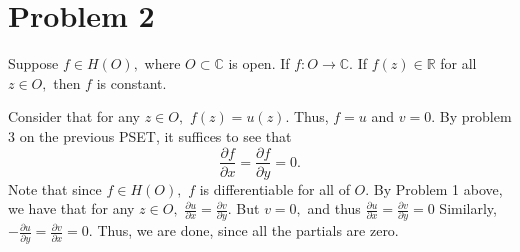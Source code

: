 \documentclass[11pt]{article}
\newcommand{\bbC}{\mathbb{C}}
\newcommand{\bbR}{\mathbb{R}}
\begin{document}
\newpage
\section*{Problem 2}
\begin{problem}
    Suppose $f \in H(O),$ where $O\subset \bbC$ is open. If $f: O \to \bbC.$ If $f(z) \in \bbR$ for all $z\in O,$ then $f$ is constant.
\end{problem}
\begin{solution}
Consider that for any $z\in O,$ $f(z) = u(z).$ Thus, $f = u$ and $v = 0.$
 By problem 3 on the previous PSET, it suffices to see that 
    \[\frac{\partial f}{\partial x} = \frac{\partial f}{\partial y} = 0.\] Note that since $f\in H(O),$ $f$ is differentiable for all of $O.$ By Problem 1 above, we have that for any $z\in O,$ 
    $\frac{\partial u}{\partial x} = \frac{\partial v}{\partial y}.$ But $v = 0,$ and thus $\frac{\partial u}{\partial x} = \frac{\partial v}{\partial y} = 0$ Similarly, $-\frac{\partial u}{\partial y} = \frac{\partial v}{\partial x} = 0.$ Thus, we are done, since all the partials are zero.
\end{solution}

\newpage
\end{document}
